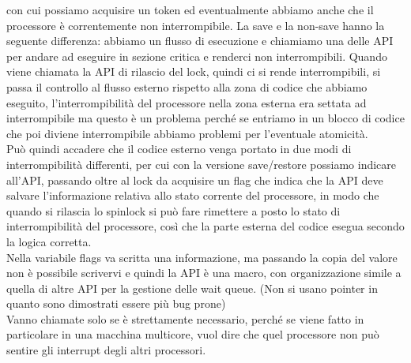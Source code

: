 \documentclass[12pt, oneside]{extbook}
\begin{document}
con cui possiamo acquisire un token ed eventualmente abbiamo anche che il processore è correntemente non interrompibile. La save e la non-save hanno la seguente differenza: abbiamo un flusso di esecuzione e chiamiamo una delle API per andare ad eseguire in sezione critica e renderci non interrompibili. Quando viene chiamata la API di rilascio del lock, quindi ci si rende interrompibili, si passa il controllo al flusso esterno rispetto alla zona di codice che abbiamo eseguito, l'interrompibilità del processore nella zona esterna era settata ad interrompibile ma questo è un problema perché se entriamo in un blocco di codice che poi diviene interrompibile abbiamo problemi per l'eventuale atomicità.\\Può quindi accadere che il codice esterno venga portato in due modi di interrompibilità differenti, per cui con la versione save/restore possiamo indicare all'API, passando oltre al lock da acquisire un flag che indica che la API deve salvare l'informazione relativa allo stato corrente del processore, in modo che quando si rilascia lo spinlock si può fare rimettere a posto lo stato di interrompibilità del processore, così che la parte esterna del codice esegua secondo la logica corretta.\\Nella variabile flags va scritta una informazione, ma passando la copia del valore non è possibile scrivervi e quindi la API è una macro, con organizzazione simile a quella di altre API per la gestione delle wait queue. (Non si usano pointer in quanto sono dimostrati essere più bug prone)\\Vanno chiamate solo se è strettamente necessario, perché se viene fatto in particolare in una macchina multicore, vuol dire che quel processore non può sentire gli interrupt degli altri processori.
\end{document}
